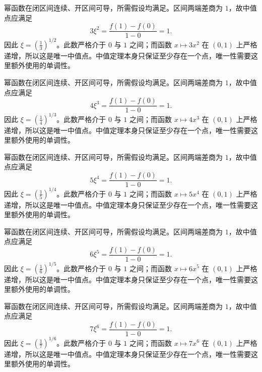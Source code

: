 \documentclass[UTF8,12pt,a4paper,fontset=fandol]{ctexart}
\begin{document}
\begin{solve}\label{ans:c10q3}
幂函数在闭区间连续、开区间可导，所需假设均满足。区间两端差商为 $1$，故中值点应满足
\[
3\xi^{2}=\frac{f(1)-f(0)}{1-0}=1.
\]
因此 $\xi=(\frac{1}{3})^{1/2}$。此数严格介于 $0$ 与 $1$ 之间；而函数 $x\mapsto 3x^{2}$ 在 $(0,1)$ 上严格递增，所以这是唯一中值点。中值定理本身只保证至少存在一个点，唯一性需要这里额外使用的单调性。
\end{solve}

\begin{solve}\label{ans:c10q4}
幂函数在闭区间连续、开区间可导，所需假设均满足。区间两端差商为 $1$，故中值点应满足
\[
4\xi^{3}=\frac{f(1)-f(0)}{1-0}=1.
\]
因此 $\xi=(\frac{1}{4})^{1/3}$。此数严格介于 $0$ 与 $1$ 之间；而函数 $x\mapsto 4x^{3}$ 在 $(0,1)$ 上严格递增，所以这是唯一中值点。中值定理本身只保证至少存在一个点，唯一性需要这里额外使用的单调性。
\end{solve}

\begin{solve}\label{ans:c10q5}
幂函数在闭区间连续、开区间可导，所需假设均满足。区间两端差商为 $1$，故中值点应满足
\[
5\xi^{4}=\frac{f(1)-f(0)}{1-0}=1.
\]
因此 $\xi=(\frac{1}{5})^{1/4}$。此数严格介于 $0$ 与 $1$ 之间；而函数 $x\mapsto 5x^{4}$ 在 $(0,1)$ 上严格递增，所以这是唯一中值点。中值定理本身只保证至少存在一个点，唯一性需要这里额外使用的单调性。
\end{solve}

\begin{solve}\label{ans:c10q6}
幂函数在闭区间连续、开区间可导，所需假设均满足。区间两端差商为 $1$，故中值点应满足
\[
6\xi^{5}=\frac{f(1)-f(0)}{1-0}=1.
\]
因此 $\xi=(\frac{1}{6})^{1/5}$。此数严格介于 $0$ 与 $1$ 之间；而函数 $x\mapsto 6x^{5}$ 在 $(0,1)$ 上严格递增，所以这是唯一中值点。中值定理本身只保证至少存在一个点，唯一性需要这里额外使用的单调性。
\end{solve}

\begin{solve}\label{ans:c10q7}
幂函数在闭区间连续、开区间可导，所需假设均满足。区间两端差商为 $1$，故中值点应满足
\[
7\xi^{6}=\frac{f(1)-f(0)}{1-0}=1.
\]
因此 $\xi=(\frac{1}{7})^{1/6}$。此数严格介于 $0$ 与 $1$ 之间；而函数 $x\mapsto 7x^{6}$ 在 $(0,1)$ 上严格递增，所以这是唯一中值点。中值定理本身只保证至少存在一个点，唯一性需要这里额外使用的单调性。
\end{solve}
\end{document}
